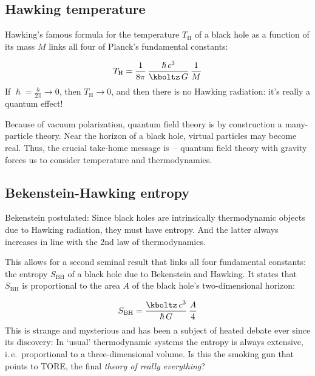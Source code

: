 \subsection*{Hawking temperature}

Hawking's famous formula for the temperature $T_{\text{H}}$ of a black hole as a function of its mass $M$ links all four of Planck's fundamental constants:

\begin{equation*}\label{eq:HawkingT}
  T_{\text{H}} = \frac{1}{8 \pi}\, \frac{\hslash\, c^3}{\kboltz\, G}\, \frac{1}{M}
\end{equation*}
%
If $\hslash=\frac{h}{2\pi}\rightarrow0$, then $T_\text{H}\rightarrow0$, and then there is no Hawking radiation: it's really a quantum effect!

Because of vacuum polarization, quantum field theory is by construction a many-particle theory. Near the horizon of a black hole, virtual particles may become real. Thus, the crucial take-home message is~-- quantum field theory with gravity forces us to consider temperature and thermodynamics.


\subsection*{Bekenstein-Hawking entropy}

Bekenstein postulated: Since black holes are intrinsically thermodynamic objects due to Hawking radiation, they must have entropy. And the latter always increases in line with the 2nd law of thermodynamics.

This allows for a second seminal result that links all four fundamental constants: the entropy $S_{\text{BH}}$ of a black hole due to Bekenstein and Hawking. It states that $S_{\text{BH}}$ is proportional to the area $A$ of the black hole's two-dimensional horizon:

\begin{equation*}
  S_{\text{BH}} = \frac{\kboltz\, c^3}{\hslash\, G}\, \frac{A}{4}
\end{equation*}
%
This is strange and mysterious and has been a subject of heated debate ever since its discovery: In \enquote*{usual} thermodynamic systems the entropy is always extensive, i.\,e.\ proportional to a three-dimensional volume. Is this the smoking gun that points to TORE, the final \emph{theory of really everything}? 

